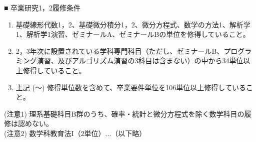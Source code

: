 \documentclass[uplatex,dvipdfmx,paper=a4,fontsize=10pt]{jlreq}
\newcommand{\maru}[1]{\raisebox{.5pt}{\textcircled{\raisebox{-.9pt} {#1}}}}
\begin{document}
\noindent
■ 卒業研究1，2履修条件
\begin{enumerate}[label=\maru{\arabic*}]
    \item 基礎線形代数1，2、基礎微分積分1，2、微分方程式、数学の方法1、解析学1、解析学1演習、ゼミナールA、ゼミナールBの単位を修得していること。
    \item 2，3年次に設置されている学科専門科目（ただし、ゼミナールB、プログラミング演習、及びアルゴリズム演習の3科目は含まない）の中から34単位以上修得していること。
    \item 上記 (\maru{1}～\maru{2}) 修得単位数を含めて、卒業要件単位を106単位以上修得していること。
\end{enumerate}

\noindent
(注意1) 理系基礎科目B群のうち、確率・統計と微分方程式を除く数学科目の履修は認めない。 \\
(注意2) 数学科教育法I（2単位）...（以下略）
\end{document}
